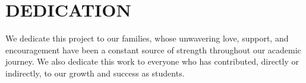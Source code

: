 \chapter*{DEDICATION}
We dedicate this project to our families, whose unwavering love, support, and encouragement have been a constant source of strength throughout our academic journey.
We also dedicate this work to everyone who has contributed, directly or indirectly, to our growth and success as students.